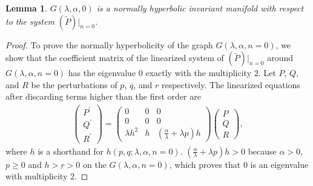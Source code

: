 \documentclass[a4paper,11pt]{article}
\newtheorem{lemma}{Lemma}[section]
\newtheorem{proposition}{Proposition}[section]
\begin{document}
\begin{lemma} \label{lem:normal_hyper}
 $G(\lambda,\alpha,0)$ is a normally hyperbolic invariant manifold with respect to the system $(\tilde{P})|_{n=0}$.
\end{lemma}
\begin{proof}
To prove the normally hyperbolicity of the graph $G(\lambda,\alpha,n=0)$, we show that the coefficient matrix of the linearized system of $(\tilde{P})|_{n=0}$ around $G(\lambda,\alpha,n=0)$ has the eigenvalue $0$ exactly with the multiplicity $2$. Let $P$, $Q$, and $R$ be the perturbations of $p$, $q$, and $r$ respectively. The linearized equations after discarding terms higher than the first order are
\begin{align*}
 \begin{pmatrix} {P}^\prime\\ {Q}^\prime \\ {R}^\prime \end{pmatrix} =
 \begin{pmatrix} 0 & 0& 0\\ 0 & 0 & 0\\ \lambda h^2 & h & ( \frac{\alpha}{ \lambda} + \lambda p )h \end{pmatrix} \begin{pmatrix} {P}\\ {Q} \\ {R} \end{pmatrix},
\end{align*}
where $h$ is a shorthand for $h(p,q;\lambda,\alpha,n=0)$. $( \frac{\alpha}{ \lambda} + \lambda p )h > 0$ because $\alpha>0$, $p\ge0$ and $h > \underbar{r}>0$ on the $G(\lambda,\alpha,n=0)$, which proves that $0$ is an eigenvalue with multiplicity $2$.
\end{proof}
% 
\end{document}
